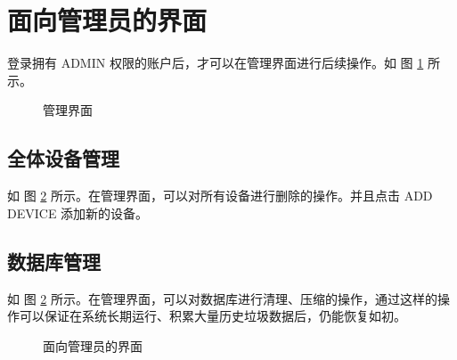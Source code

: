 \documentclass[degree=course]{sjtuthesis}
\begin{document}
\section{面向管理员的界面}
登录拥有 ADMIN 权限的账户后，才可以在管理界面进行后续操作。如 图 \ref{fig:device_admin1} 所示。
\begin{figure}[htbp]
    \noindent{}
    \caption{管理界面}\label{fig:device_admin1}
\end{figure}

\subsection{全体设备管理}
如 图 \ref{fig:device_admin2} 所示。在管理界面，可以对所有设备进行删除的操作。并且点击 ADD DEVICE 添加新的设备。
\subsection{数据库管理}
如 图 \ref{fig:device_admin2} 所示。在管理界面，可以对数据库进行清理、压缩的操作，通过这样的操作可以保证在系统长期运行、积累大量历史垃圾数据后，仍能恢复如初。

\begin{figure}[htbp]
    \noindent{}
    \caption{面向管理员的界面}\label{fig:device_admin2}
\end{figure}
\end{document}
